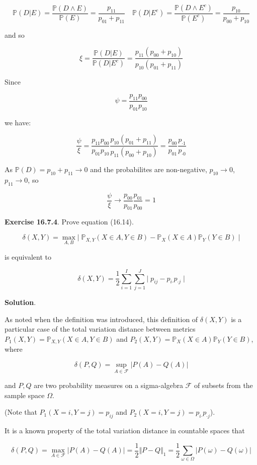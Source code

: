 {\[ \mathbb{P}(D | E) = \frac{\mathbb{P}(D \land E)}{\mathbb{P}(E)} = \frac{p_{11}}{p_{01} + p_{11}}
\quad
\mathbb{P}(D | E^c) = \frac{\mathbb{P}(D \land E^c)}{\mathbb{P}(E^c)} = \frac{p_{10}}{p_{00} + p_{10}}
\]

and so

\[
\xi = \frac{\mathbb{P}(D | E)}{\mathbb{P}(D | E^c)}
= \frac{p_{11} (p_{00} + p_{10})}{p_{10} (p_{01} + p_{11})}
\]

Since

\[ \psi = \frac{p_{11}p_{00}}{p_{01}p_{10}}\]

we have:

\[ \frac{\psi}{\xi} = \frac{p_{11}p_{00}}{p_{01}p_{10}} \frac{p_{10} (p_{01} + p_{11})}{p_{11} (p_{00} + p_{10})} 
= \frac{p_{00}}{p_{01}} \frac{p_{\text{·}1}}{p_{\text{·}0}}
\]

As \(\mathbb{P}(D) = p_{10} + p_{11} \rightarrow 0\) and the
probabilites are non-negative, \(p_{10} \rightarrow 0\),
\(p_{11} \rightarrow 0\), so

\[ \frac{\psi}{\xi} \rightarrow  \frac{p_{00}}{p_{01}} \frac{p_{01}}{p_{00}} = 1 \]

\textbf{Exercise 16.7.4}. Prove equation (16.14).

\[ \delta(X, Y) = \max_{A, B} \Big|\; \mathbb{P}_{X, Y}(X \in A, Y \in B) - \mathbb{P}_X(X \in A) \mathbb{P}_Y(Y \in B) \;\Big| \]

is equivalent to

\[ \delta(X, Y) = \frac{1}{2} \sum_{i=1}^I \sum_{j=1}^J \Big|\; p_{ij} - p_{i\text{·}} p_{\text{·}j} \;\Big|\]

\textbf{Solution}.

As noted when the definition was introduced, this definition of
\(\delta(X, Y)\) is a particular case of the total variation distance
between metrics \(P_1(X, Y) = \mathbb{P}_{X, Y}(X \in A, Y \in B)\) and
\(P_2(X, Y) = \mathbb{P}_X(X \in A) \mathbb{P}_Y(Y \in B)\), where

\[ \delta(P, Q) = \sup_{A \in \mathcal{F}} |P(A) - Q(A)| \]

and \(P, Q\) are two probability measures on a sigma-algebra
\(\mathcal{F}\) of subsets from the sample space \(\Omega\).

(Note that \(P_1(X = i, Y = j) = p_{ij}\) and
\(P_2(X = i, Y = j) =  p_{i\text{·}} p_{\text{·}j}\)).

It is a known property of the total variation distance in countable
spaces that

\[ \delta(P, Q) = \max_{A \in \mathcal{F}} |P(A) - Q(A)| = \frac{1}{2} \Vert P - Q \Vert_1 = \frac{1}{2} \sum_{\omega \in \Omega} \vert P(\omega) - Q(\omega) \vert\]

}
